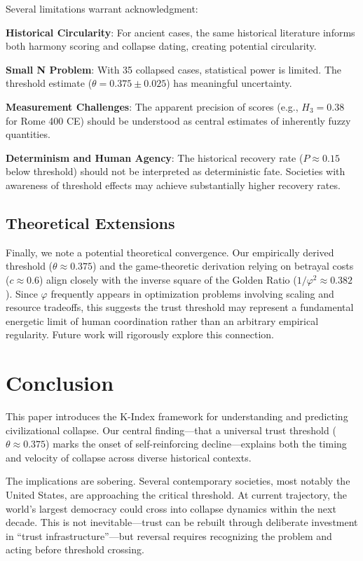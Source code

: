 \documentclass[11pt,a4paper]{article}
\newcommand{\Hthree}{H_3}
\begin{document}
Several limitations warrant acknowledgment:

\textbf{Historical Circularity}: For ancient cases, the same historical literature informs both harmony scoring and collapse dating, creating potential circularity.

\textbf{Small N Problem}: With 35 collapsed cases, statistical power is limited. The threshold estimate ($\theta = 0.375 \pm 0.025$) has meaningful uncertainty.

\textbf{Measurement Challenges}: The apparent precision of scores (e.g., $\Hthree = 0.38$ for Rome 400 CE) should be understood as central estimates of inherently fuzzy quantities.

\textbf{Determinism and Human Agency}: The historical recovery rate ($P \approx 0.15$ below threshold) should not be interpreted as deterministic fate. Societies with awareness of threshold effects may achieve substantially higher recovery rates.

\subsection{Theoretical Extensions}

Finally, we note a potential theoretical convergence. Our empirically derived threshold ($\theta \approx 0.375$) and the game-theoretic derivation relying on betrayal costs ($c \approx 0.6$) align closely with the inverse square of the Golden Ratio ($1/\varphi^2 \approx 0.382$). Since $\varphi$ frequently appears in optimization problems involving scaling and resource tradeoffs, this suggests the trust threshold may represent a fundamental energetic limit of human coordination rather than an arbitrary empirical regularity. Future work will rigorously explore this connection.

\section{Conclusion}

This paper introduces the K-Index framework for understanding and predicting civilizational collapse. Our central finding---that a universal trust threshold ($\theta \approx 0.375$) marks the onset of self-reinforcing decline---explains both the timing and velocity of collapse across diverse historical contexts.

The implications are sobering. Several contemporary societies, most notably the United States, are approaching the critical threshold. At current trajectory, the world's largest democracy could cross into collapse dynamics within the next decade. This is not inevitable---trust can be rebuilt through deliberate investment in ``trust infrastructure''---but reversal requires recognizing the problem and acting before threshold crossing.
\end{document}
